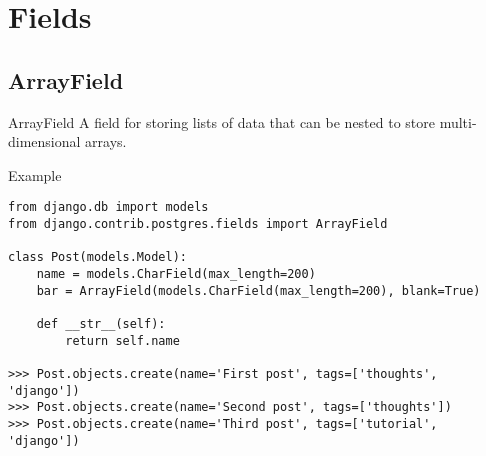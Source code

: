 \section{Fields}
\subsection{ArrayField}
\begin{frame}[fragile]{ArrayField}
    A field for storing lists of data that can be nested to store multi-dimensional arrays.

    \begin{block}{Example}
        \begin{verbatim}
from django.db import models
from django.contrib.postgres.fields import ArrayField

class Post(models.Model):
    name = models.CharField(max_length=200)
    bar = ArrayField(models.CharField(max_length=200), blank=True)

    def __str__(self):
        return self.name

>>> Post.objects.create(name='First post', tags=['thoughts', 'django'])
>>> Post.objects.create(name='Second post', tags=['thoughts'])
>>> Post.objects.create(name='Third post', tags=['tutorial', 'django'])
        \end{verbatim}
    \end{block}
\end{frame}
